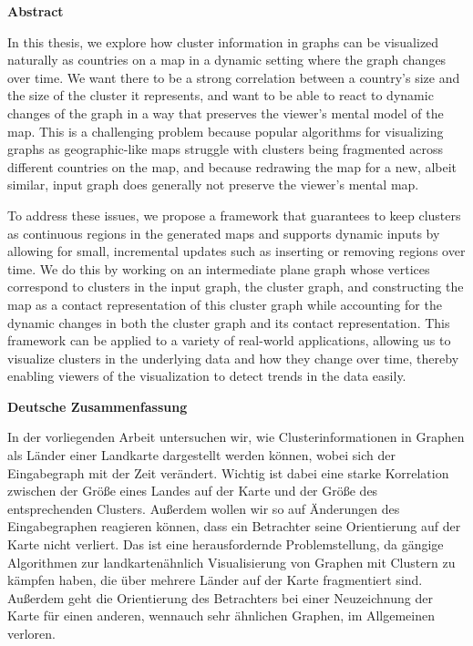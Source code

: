 \begin{addmargin}{0.5cm}

\centerline{\textbf{Abstract}}

In this thesis, we explore how cluster information in graphs can be visualized naturally as countries on a map in a dynamic setting where the graph changes over time.
We want there to be a strong correlation between a country's size and the size of the cluster it represents, and want to be able to react to dynamic changes of the graph in a way that preserves the viewer's mental model of the map.
This is a challenging problem because popular algorithms for visualizing graphs as geographic-like maps struggle with clusters being fragmented across different countries on the map, and because redrawing the map for a new, albeit similar, input graph does generally not preserve the viewer's mental map.

To address these issues, we propose a framework that guarantees to keep clusters as continuous regions in the generated maps and supports dynamic inputs by allowing for small, incremental updates such as inserting or removing regions over time.
We do this by working on an intermediate plane graph whose vertices correspond to clusters in the input graph, the cluster graph, and constructing the map as a contact representation of this cluster graph while accounting for the dynamic changes in both the cluster graph and its contact representation.
This framework can be applied to a variety of real-world applications, allowing us to visualize clusters in the underlying data and how they change over time, thereby enabling viewers of the visualization to detect trends in the data easily.

\vskip 2cm

\centerline{\textbf{Deutsche Zusammenfassung}}

In der vorliegenden Arbeit untersuchen wir, wie Clusterinformationen in Graphen als Länder einer Landkarte dargestellt werden können, wobei sich der Eingabegraph mit der Zeit verändert.
Wichtig ist dabei eine starke Korrelation zwischen der Größe eines Landes auf der Karte und der Größe des entsprechenden Clusters.
Außerdem wollen wir so auf Änderungen des Eingabegraphen reagieren können, dass ein Betrachter seine Orientierung auf der Karte nicht verliert.
Das ist eine herausfordernde Problemstellung, da gängige Algorithmen zur landkartenähnlich Visualisierung von Graphen mit Clustern zu kämpfen haben, die über mehrere Länder auf der Karte fragmentiert sind.
Außerdem geht die Orientierung des Betrachters bei einer Neuzeichnung der Karte für einen anderen, wennauch sehr ähnlichen Graphen, im Allgemeinen verloren.


\end{addmargin}
